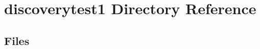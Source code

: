\section{discoverytest1 Directory Reference}
\label{dir_a2562f36b8ddccb67ea53ffbb9bcbec6}
\subsection*{Files}
\begin{DoxyCompactItemize}
\end{DoxyCompactItemize}
